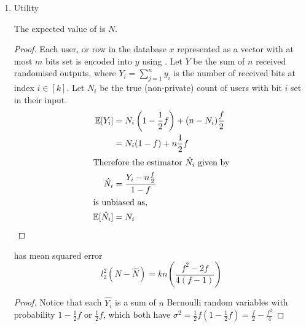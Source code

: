 \documentclass{article}
\begin{document}
\begin{enumerate}
\begin{proof}
\begin{align}
	\end{align}
	Notice that by equation~\ref{eq:privacy:cancel-k} the privacy is not dependent on $k$ and equation~\ref{eq:maximise-product} is maximised when $y_1=1,\ldots,y_m=1$, and $y_{m+1},\ldots,y_{2m}=0$, giving
	\begin{align*}
		D &\leq \left(1-\frac{1}{2}f\right)^{2m}\times\left(\frac{1}{2}f\right)^{-2m}\\
			&= \left(\frac{2-f}{f}\right)^{2m}
	\end{align*}
	Therefore,
	\begin{equation}
		\varepsilon \leq 2m\log\left(\frac{2-f}{f}\right)
	\end{equation}
\end{proof}
\item Utility
\begin{theorem}
\label{thm:unbiased-estimator}
	The expected value of  is $N$.
\end{theorem}
\begin{proof} Each user, or row in the database $x$ represented as a vector with at most $m$ bits set is encoded into $y$ using . Let $Y$ be the sum of  $n$ received randomised outputs, where $Y_i=\sum_{j=1}^n y_i$ is the number of received bits at index $i\in [k]$. Let $N_i$ be the true (non-private) count of users with bit $i$ set in their input.
\begin{align}
\mathbb{E}[Y_i] &= N_i\left(1-\frac{1}{2}f\right) + (n-N_i)\frac{f}{2}\nonumber\\
	&= N_i(1-f) + n\frac{1}{2}f\nonumber\\
	\intertext{Therefore the estimator $\hat{N_i}$ given by}
\hat{N_i} &= \frac{Y_i-n\frac{f}{2}}{1-f}\label{eq:estimator}\\
\intertext{is unbiased as,}
\mathbb{E}[\hat{N_i}] &= N_i
\end{align}
\end{proof}
\begin{theorem}
	 has mean squared error
	\begin{equation*}
		l_2^2(N-\hat{N}) = kn\left(\frac{f^2-2f}{4(f-1)}\right)
	\end{equation*}
\end{theorem}
\begin{proof}\hfill
Notice that each $\hat{Y_i}$ is a sum of $n$ Bernoulli random variables with probability $1-\frac{1}{2}f$ or $\frac{1}{2}f$, which both have $\sigma^2 = \frac{1}{2}f\left(1-\frac{1}{2}f\right) = \frac{f}{2}-\frac{f^2}{4}$

\end{proof}
\end{enumerate}
\end{document}
